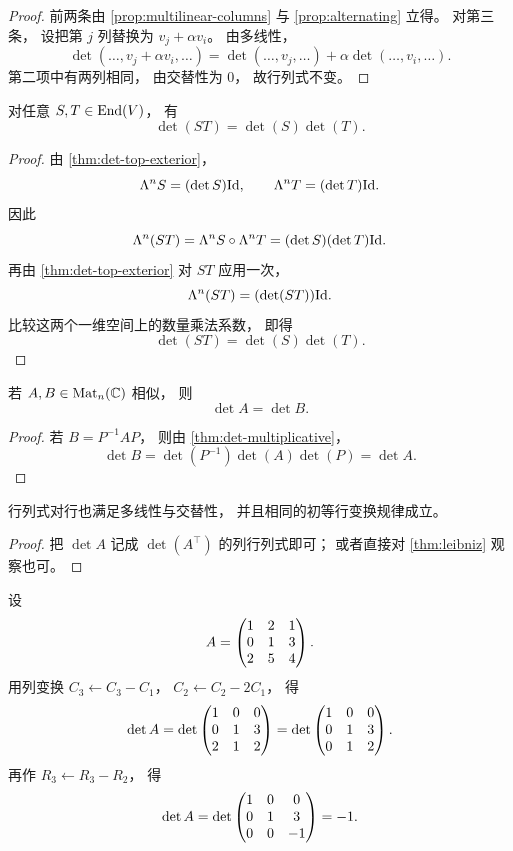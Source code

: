 \begin{proof} 前两条由 \cref{prop:multilinear-columns} 与 \cref{prop:alternating} 立得。 对第三条， 设把第 \(j\) 列替换为 \(v_j+\alpha v_i\)。 由多线性， \[ \det(\dots,v_j+\alpha v_i,\dots) = \det(\dots,v_j,\dots)+\alpha\det(\dots,v_i,\dots). \] 第二项中有两列相同， 由交替性为 \(0\)， 故行列式不变。 \end{proof}




\begin{theorem}[乘法性]\label{thm:det-multiplicative} 对任意 \(S,T\in \mathrm{End}(V)\)， 有 \[ \det(ST)=\det(S)\det(T). \] \end{theorem}




\begin{proof} 由 \cref{thm:det-top-exterior}， \[ \Lambda^n S=(\det S)\mathrm{Id},\qquad \Lambda^n T=(\det T)\mathrm{Id}. \] 因此 \[ \Lambda^n(ST)=\Lambda^n S\circ \Lambda^n T = (\det S)(\det T)\mathrm{Id}. \] 再由 \cref{thm:det-top-exterior} 对 \(ST\) 应用一次， \[ \Lambda^n(ST)=(\det(ST))\mathrm{Id}. \] 比较这两个一维空间上的数量乘法系数， 即得 \[ \det(ST)=\det(S)\det(T). \] \end{proof}




\begin{corollary}[相似不变性] 若 \(A,B\in \mathrm{Mat}_n(\mathbb{C})\) 相似， 则 \[ \det A=\det B. \] \end{corollary}




\begin{proof} 若 \(B=P^{-1}AP\)， 则由 \cref{thm:det-multiplicative}， \[ \det B=\det(P^{-1})\det(A)\det(P)=\det A. \] \end{proof}




\begin{corollary}[按行的相应性质] 行列式对行也满足多线性与交替性， 并且相同的初等行变换规律成立。 \end{corollary}




\begin{proof} 把 \(\det A\) 记成 \(\det(A^\top)\) 的列行列式即可； 或者直接对 \cref{thm:leibniz} 观察也可。 \end{proof}




\begin{example} 设 \[ A=\begin{pmatrix}  1&2&1\\ 0&1&3\\ 2&5&4 \end{pmatrix}. \] 用列变换 \(C_3\leftarrow C_3-C_1\)， \(C_2\leftarrow C_2-2C_1\)， 得 \[ \det A = \det\begin{pmatrix}  1&0&0\\ 0&1&3\\ 2&1&2 \end{pmatrix} = \det\begin{pmatrix}  1&0&0\\ 0&1&3\\ 0&1&2 \end{pmatrix}. \] 再作 \(R_3\leftarrow R_3-R_2\)， 得 \[ \det A = \det\begin{pmatrix}  1&0&0\\ 0&1&3\\ 0&0&-1 \end{pmatrix} =-1. \] \end{example}




